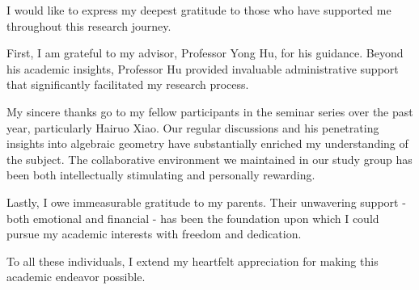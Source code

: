 
\begin{acknowledgements}
I would like to express my deepest gratitude to those who have supported me throughout this research journey.

First, I am grateful to my advisor, Professor Yong Hu, for his guidance. Beyond his academic insights, Professor Hu provided invaluable administrative support that significantly facilitated my research process. 

My sincere thanks go to my fellow participants in the seminar series over the past year, particularly Hairuo Xiao. Our regular discussions and his penetrating insights into algebraic geometry have substantially enriched my understanding of the subject. The collaborative environment we maintained in our study group has been both intellectually stimulating and personally rewarding.

Lastly, I owe immeasurable gratitude to my parents. Their unwavering support - both emotional and financial - has been the foundation upon which I could pursue my academic interests with freedom and dedication.

To all these individuals, I extend my heartfelt appreciation for making this academic endeavor possible.


\end{acknowledgements}
